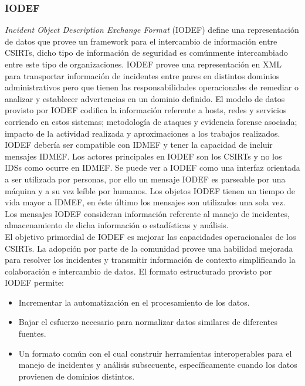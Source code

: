 \subsubsection{IODEF}

\textit{Incident Object Description Exchange Format} (IODEF) define una representación de datos que provee un framework para el 
intercambio de información entre CSIRTs, dicho tipo de información de seguridad 
es comúnmente intercambiado entre este tipo de organizaciones. IODEF provee una 
representación en XML para transportar información de incidentes entre pares en 
distintos dominios administrativos pero que tienen las responsabilidades 
operacionales de remediar o analizar y establecer advertencias en un dominio 
definido. El modelo de datos provisto por IODEF codifica la información 
referente a hosts, redes y servicios corriendo en estos sistemas; metodología 
de ataques y evidencia forense asociada; impacto de la actividad realizada y
aproximaciones a los trabajos realizados.\\

IODEF debería ser compatible con IDMEF y tener la capacidad de incluir mensajes 
IDMEF. Los actores principales en IODEF son los CSIRTs y no los IDSs como ocurre 
en IDMEF. Se puede ver a IODEF como una interfaz orientada a ser utilizada por 
personas, por ello un mensaje IODEF es parseable por una máquina y a su vez 
leíble por humanos. Los objetos IODEF tienen un tiempo de vida mayor a IDMEF, 
en éste último los mensajes son utilizados una sola vez. Los mensajes IODEF consideran 
información referente al manejo de incidentes, almacenamiento de dicha 
información o estadísticas y análisis.\\

El objetivo primordial de IODEF es mejorar las capacidades operacionales de los 
CSIRTs. La adopción por parte de la comunidad provee una habilidad mejorada para 
resolver los incidentes y transmitir información de contexto simplificando la 
colaboración e intercambio de datos.
El formato estructurado provisto por IODEF permite:
\begin{itemize}
  \item Incrementar la automatización en el procesamiento de los datos.
  \item Bajar el esfuerzo necesario para normalizar datos similares de 
  diferentes fuentes.
  \item Un formato común con el cual construir herramientas interoperables para 
  el manejo de incidentes y análisis subsecuente, específicamente cuando 
  los datos provienen de dominios distintos.
\end{itemize}

